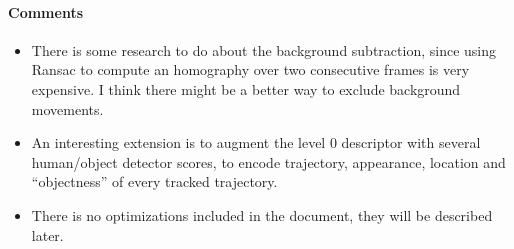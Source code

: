 \documentclass[10pt,letterpaper]{article}
\newcommand{\+}[1]{\ensuremath{{\boldsymbol #1}}}
\begin{document}
\paragraph{Comments}
\begin{itemize}
\item There is some research to do about the background subtraction, since using Ransac to compute an homography over two consecutive frames is very expensive. I think there might be a better way to exclude background movements.
\item An interesting extension is to augment the level 0 descriptor with several human/object detector scores, to encode trajectory, appearance, location and ``objectness'' of every tracked trajectory.
\item There is no optimizations included in the document, they will be described later.
\end{itemize}
\end{document}
